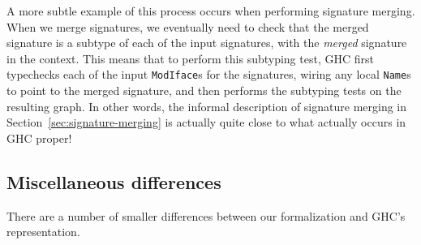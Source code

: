 A more subtle example of this process occurs when performing
signature merging.  When we merge signatures, we eventually need
to check that the merged signature is a subtype of each of the
input signatures, with the \emph{merged} signature in the context.
This means that to perform this subtyping test, GHC first typechecks
each of the input \verb|ModIface|s for the signatures, wiring any
local \verb|Name|s to point to the merged signature, and then performs
the subtyping tests on the resulting graph.  In other words, the
informal description of signature merging in Section~\ref{sec:signature-merging}
is actually quite close to what actually occurs in GHC proper!

\subsection{Miscellaneous differences}

There are a number of smaller differences between our formalization
and GHC's representation.

